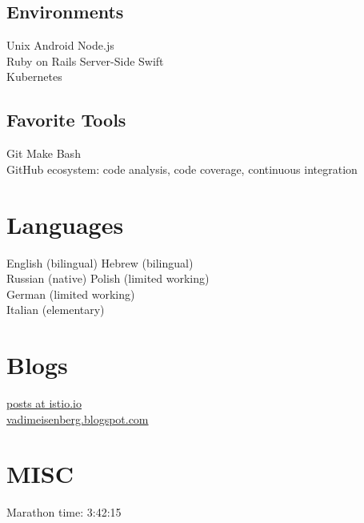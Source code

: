 \documentclass[]{deedy-resume}
\begin{document}
\begin{minipage}[t]{0.33\textwidth}
\subsection{Environments}
Unix \textbullet{}  Android \textbullet{}  Node.js \\
Ruby on Rails \textbullet{} Server-Side Swift \\
Kubernetes
\sectionsep

\subsection{Favorite Tools}
Git \textbullet{}  Make \textbullet{}  Bash \textbullet{} \\
GitHub ecosystem: code analysis, code coverage, continuous integration
\sectionsep

\section{Languages}
\vspace{\topsep} %
English (bilingual) \textbullet{} Hebrew (bilingual) \\
Russian (native)  \textbullet{} Polish (limited working) \\
German (limited working) \\
Italian (elementary)
\sectionsep

\sectionsep

\section{Blogs}
\href{https://istio.io/search.html?q=vadim\%20eisenberg}{posts at istio.io} \\
\href{http://vadimeisenberg.blogspot.com}{vadimeisenberg.blogspot.com}
\sectionsep

\sectionsep

\section{MISC}
Marathon time: 3:42:15

%
%

\end{minipage}
\end{document}
